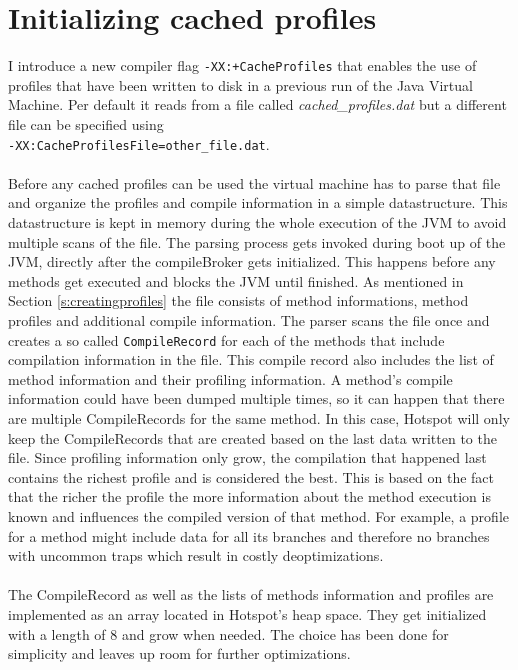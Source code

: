 \section{Initializing cached profiles}
\label{s:initializingprofiles}
I introduce a new compiler flag \texttt{-XX:+CacheProfiles} that enables the use of profiles that have been written to disk in a previous run of the Java Virtual Machine. Per default it reads from a file called \textit{cached\_profiles.dat} but a different file can be specified using \\\texttt{-XX:CacheProfilesFile=other\_file.dat}.
\\\\
Before any cached profiles can be used the virtual machine has to parse that file and organize the profiles and compile information in a simple datastructure. This datastructure is kept in memory during the whole execution of the JVM to avoid multiple scans of the file.
The parsing process gets invoked during boot up of the JVM, directly after the compileBroker gets initialized. This happens before any methods get executed and blocks the JVM until finished.
As mentioned in Section \ref{s:creatingprofiles} the file consists of method informations, method profiles and additional compile information. The parser scans the file once and creates a so called \texttt{CompileRecord} for each of the methods that include compilation information in the file. This compile record also includes the list of method information and their profiling information.
A method's compile information could have been dumped multiple times, so it can happen that there are multiple CompileRecords for the same method. In this case, Hotspot will only keep the CompileRecords that are created based on the last data written to the file.
Since profiling information only grow, the compilation that happened last contains the richest profile and is considered the best.
This is based on the fact that the richer the profile the more information about the method execution is known and influences the compiled version of that method. For example, a profile for a method might include data for all its branches and therefore no branches with uncommon traps which result in costly deoptimizations.
\\\\
The CompileRecord as well as the lists of methods information and profiles are implemented as an array located in Hotspot's heap space.
They get initialized with a length of 8 and grow when needed. The choice has been done for simplicity and leaves up room for further optimizations.

